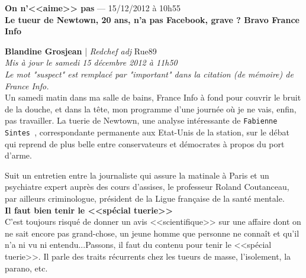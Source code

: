 \documentclass[11pt,twoside,a4paper]{article}
\begin{document}
\textbf{On n'<<aime>> pas} --- 15/12/2012 {\`a} 10h55~\\

\textbf{\LARGE Le tueur de Newtown, 20 ans, n'a pas Facebook, grave ? Bravo France Info}

{\small \textbf{Blandine Grosjean} | \emph{Redchef adj} Rue89}~\\


\emph{Mis {\`a} jour le samedi 15 d{\'e}cembre 2012 {\`a} 11h50}~\\
\emph{Le mot "suspect" est remplac{\'e} par "important" dans la citation (de m{\'e}moire) de France Info.}~\\

Un samedi matin dans ma salle de bains, France Info {\`a} fond pour couvrir le bruit de la douche, et dans la t{\^e}te, mon programme d'une journ{\'e}e o{\`u} je ne vais, enfin, pas travailler. La tuerie de Newtown, une analyse int{\'e}ressante de \texttt{Fabienne Sintes~\footnotemark}, correspondante permanente aux Etat-Unis de la station, sur le d{\'e}bat qui reprend de plus belle entre conservateurs et d{\'e}mocrates {\`a} propos du port d'arme. ~\\

Suit un entretien entre la journaliste qui assure la matinale {\`a} Paris et un psychiatre expert aupr{\`e}s des cours d'assises, le professeur Roland Coutanceau, par ailleurs criminologue, pr{\'e}sident de la Ligue fran\c{c}aise de la sant{\'e} mentale. ~\\

\textbf{Il faut bien tenir le <<sp{\'e}cial tuerie>>}~\\

C'est toujours risqu{\'e} de donner un avis <<scientifique>> sur une affaire dont on ne sait encore pas grand-chose, un jeune homme que personne ne conna{\^i}t et qu'il n'a ni vu ni entendu...Passons, il faut du contenu pour tenir le <<sp{\'e}cial tuerie>>. Il parle des traits r{\'e}currents chez les tueurs de masse, l'isolement, la parano, etc. ~\\
\end{document}
